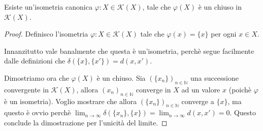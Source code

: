 \begin{lemma}\label{IsometriaCanonica}
	Esiste un'isometria canonica $\varphi: X\in \mathcal{K}(X)$, tale che $\varphi(X)$ è un chiuso in $\mathcal{K}(X)$.
\end{lemma}
\begin{proof}
	Definisco l'isometria $\varphi: X\in\mathcal{K}(X)$ tale che $\varphi(x)=\{x\}$ per ogni $x\in X$. 
	
	Innanzitutto vale banalmente che questa è un'isometria, perchè segue facilmente dalle definizioni che $\delta(\{ x \}, \{ x' \})=d(x,x')$.
	
	Dimostriamo ora che $\varphi(X)$ è un chiuso. Sia $(\{ x_n \})_{n\in \mathbb{N}}$ una successione convergente in $\mathcal{K}(X)$, allora $(x_n)_{n\in \mathbb{N}}$ converge in $X$ ad un valore $x$ (poichè $\varphi$ è un isometria). Voglio mostrare che allora $(\{ x_n \})_{n\in \mathbb{N}}$ converge a $\{ x \}$, ma questo è ovvio perchè $\lim_{n\to\infty} \delta(\{ x_n \}, \{x\})=\lim_{n\to\infty} d(x,x')=0$. Questo conclude la dimostrazione per l'unicità del limite.
\end{proof}









